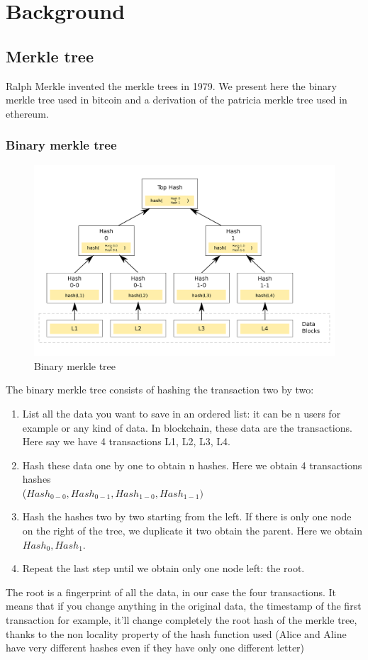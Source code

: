 \chapter{Background}
\section{Merkle tree}
Ralph Merkle invented the merkle trees in 1979. We present here the binary merkle tree used in bitcoin and a derivation of the patricia merkle tree used in ethereum.
\subsection{Binary merkle tree}
\begin{figure}[H]
    \centering
\includegraphics[width=0.7\linewidth]{background/merkle.png}
    \caption{Binary merkle tree}
    \label{fig:merkle}
\end{figure}
The binary merkle tree consists of hashing the transaction two by two: 
\begin{enumerate}
    \item List all the data you want to save in an ordered list: it can be n users for example or any kind of data. In blockchain, these data are the transactions. Here say we have 4 transactions L1, L2, L3, L4.
    \item Hash these data one by one to obtain n hashes. Here we obtain 4 transactions hashes \\($Hash_{0-0},Hash_{0-1},Hash_{1-0},Hash_{1-1})$
    \item Hash the hashes two by two starting from the left. If there is only one node on the right of the tree, we duplicate it two obtain the parent. Here we obtain $Hash_0, Hash_1$.
    \item Repeat the last step until we obtain only one node left: the root.
\end{enumerate}
The root is a fingerprint of all the data, in our case the four transactions. 
It means that if you change anything in the original data, the timestamp of the first transaction for example, it'll change completely the root hash of the merkle tree, thanks to the non locality property of the hash function used (Alice and Aline have very different hashes even if they have only one different letter)

